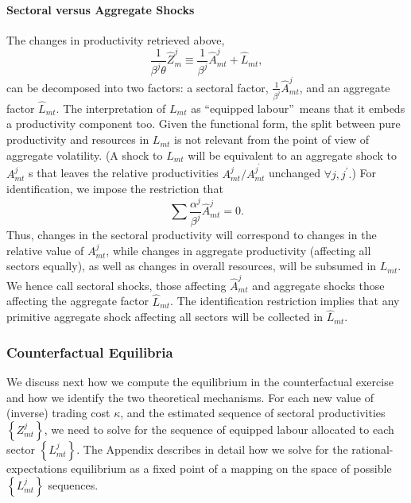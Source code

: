\documentclass[12pt]{article}
\begin{document}
\paragraph{Sectoral versus Aggregate Shocks}

The changes in productivity retrieved above, 
\begin{equation}
\frac{1}{\beta ^{j}\theta }\hat{Z}_{m}^{j}\equiv \frac{1}{\beta ^{j}}\hat{A}%
_{mt}^{j}+\hat{L}_{mt},  \label{prodchanges}
\end{equation}%
can be decomposed into two factors: a sectoral factor, $\frac{1}{\beta ^{j}}%
\hat{A}_{mt}^{j}$, and an aggregate factor $\hat{L}_{mt}$. The
interpretation of $L_{mt}$ as \textquotedblleft equipped
labour\textquotedblright\ means that it embeds a productivity component too.
Given the functional form, the split between pure productivity and resources
in $L_{mt}$ is not relevant from the point of view of aggregate volatility.
(A shock to $L_{mt}$ will be equivalent to an aggregate shock to $A_{mt}^{j}$%
s that leaves the relative productivities $A_{mt}^{j}/A_{mt}^{j^{\prime }}$
unchanged $\forall j,j^{\prime }.$) For identification, we impose the
restriction that 
\begin{equation}
\sum \frac{\alpha ^{j}}{\beta ^{j}}\hat{A}_{mt}^{j}=0.  \label{idrestriction}
\end{equation}%
Thus, changes in the sectoral productivity will correspond to changes in the
relative value of $A_{mt}^{j}$, while changes in aggregate productivity
(affecting all sectors equally), as well as changes in overall resources,
will be subsumed in $L_{mt}$. We hence call sectoral shocks, those affecting 
$\hat{A}_{mt}^{j}$ and aggregate shocks those affecting the aggregate factor 
$\hat{L}_{mt}$. The identification restriction implies that any primitive
aggregate shock affecting all sectors will be collected in $\hat{L}_{mt}.$

\subsubsection{Counterfactual Equilibria}

We discuss next how we compute the equilibrium in the counterfactual
exercise and how we identify the two theoretical mechanisms. For each new
value of (inverse) trading cost $\kappa $, and the estimated sequence of
sectoral productivities $\left\{ Z_{mt}^{j}\right\} $, we need to solve for
the sequence of equipped labour allocated to each sector $\left\{
L_{mt}^{j}\right\} $. The Appendix describes in detail how we solve for the
rational-expectations equilibrium as a fixed point of a mapping on the space
of possible $\left\{ L_{mt}^{j}\right\} $ sequences.
\end{document}
